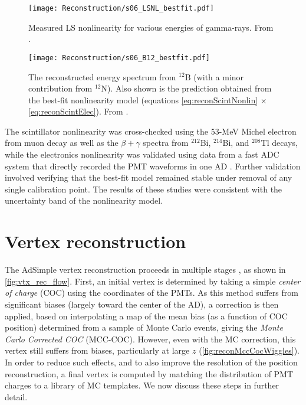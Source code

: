 \documentclass[../thesis.tex]{subfiles}
\begin{document}
\begin{figure}[h]
  \texttt{[image: Reconstruction/s06\_LSNL\_bestfit.pdf]}
  \caption{Measured LS nonlinearity for various energies of gamma-rays. From \cite{NonlinearityPaper}.}
  \label{fig:reconGammaLines}
\end{figure}

\begin{figure}[h]
  \texttt{[image: Reconstruction/s06\_B12\_bestfit.pdf]}
  \caption{The reconstructed energy spectrum from $^{12}$B (with a minor contribution from $^{12}$N). Also shown is the prediction obtained from the best-fit nonlinearity model (equations \autoref{eq:reconScintNonlin} $\times$ \autoref{eq:reconScintElec}). From \cite{NonlinearityPaper}.}
  \label{fig:reconB12}
\end{figure}

The scintillator nonlinearity was cross-checked using the 53-MeV Michel electron from muon decay as well as the $\beta+\gamma$ spectra from $^{212}$Bi, $^{214}$Bi, and $^{208}$Tl decays, while the electronics nonlinearity was validated using data from a fast ADC system that directly recorded the PMT waveforms in one AD \cite{HUANG201848}. Further validation involved verifying that the best-fit model remained stable under removal of any single calibration point. The results of these studies were consistent with the uncertainty band of the nonlinearity model.

\section{Vertex reconstruction}
\label{chap:reconVertex}

The AdSimple vertex reconstruction proceeds in multiple stages \cite{adsimple1,adsimple2}, as shown in \autoref{fig:vtx_rec_flow}. First, an initial vertex is determined by taking a simple \emph{center of charge} (COC) using the coordinates of the PMTs. As this method suffers from significant biases (largely toward the center of the AD), a correction is then applied, based on interpolating a map of the mean bias (as a function of COC position) determined from a sample of Monte Carlo events, giving the \emph{Monte Carlo Corrected COC} (MCC-COC). However, even with the MC correction, this vertex still suffers from biases, particularly at large $z$ (\autoref{fig:reconMccCocWiggles}). In order to reduce such effects, and to also improve the resolution of the position reconstruction, a final vertex is computed by matching the distribution of PMT charges to a library of MC templates. We now discuss these steps in further detail. 
\end{document}
